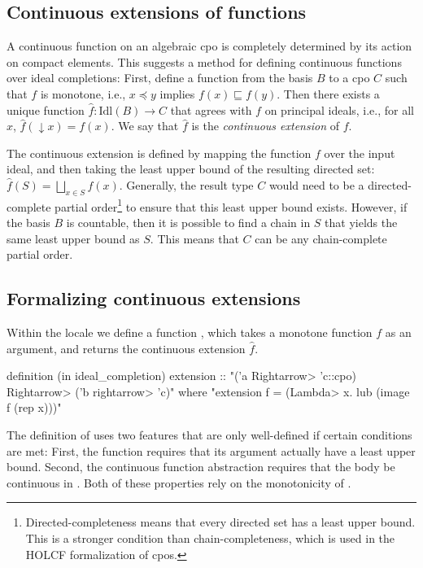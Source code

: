 \subsection{Continuous extensions of functions}

A continuous function on an algebraic cpo is completely determined by its action on compact elements. This suggests a method for defining continuous functions over ideal completions: First, define a function from the basis $B$ to a cpo $C$ such that $f$ is monotone, i.e., $x\preceq y$ implies $f(x)\sqsubseteq f(y)$. Then there exists a unique function $\widehat{f}:\mathrm{Idl}(B)\rightarrow C$ that agrees with $f$ on principal ideals, i.e., for all $x$, $\widehat{f}(\downarrow\! x)=f(x)$. We say that $\widehat{f}$ is the \emph{continuous extension} of $f$.

The continuous extension is defined by mapping the function $f$ over the input ideal, and then taking the least upper bound of the resulting directed set: $\widehat{f}(S)=\bigsqcup_{x\in S}f(x)$. Generally, the result type $C$ would need to be a directed-complete partial order\footnote{Directed-completeness means that every directed set has a least upper bound. This is a stronger condition than chain-completeness, which is used in the HOLCF formalization of cpos.} to ensure that this least upper bound exists. However, if the basis $B$ is countable, then it is possible to find a chain in $S$ that yields the same least upper bound as $S$. This means that $C$ can be any chain-complete partial order.

\subsection{Formalizing continuous extensions}

Within the  locale we define a function , which takes a monotone function $f$ as an argument, and returns the continuous extension $\widehat{f}$.
%
\begin{isacode}
definition (in ideal_completion) extension :: "('a \<Rightarrow> 'c::cpo) \<Rightarrow> ('b \<rightarrow> 'c)"
  where "extension f = (\<Lambda> x. lub (image f (rep x)))"
\end{isacode}
%
The definition of  uses two features that are only well-defined if certain conditions are met: First, the function  requires that its argument actually have a least upper bound. Second, the continuous function abstraction requires that the body be continuous in . Both of these properties rely on the monotonicity of .

